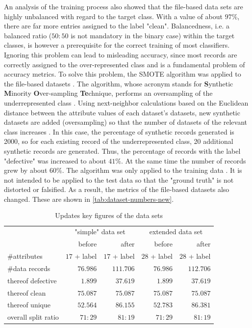 An analysis of the training process also showed that the file-based data sets are highly unbalanced with regard to the target class. With a value of about $97\%$, there are far more entries assigned to the label "clean". Balancedness, i.e. a balanced ratio ($50:50$ is not mandatory in the binary case) within the target classes, is however a prerequisite for the correct training of most classifiers. Ignoring this problem can lead to misleading accuracy, since most records are correctly assigned to the over-represented class and is a fundamental problem of accuracy metrics. To solve this problem, the SMOTE algorithm was applied to the file-based datasets \cite{Chawla2002}. The algorithm, whose acronym stands for \textbf{S}ynthetic \textbf{M}inority \textbf{O}ver-sampling \textbf{Te}chnique, performs an oversampling of the underrepresented class \cite{Chawla2002}. Using next-neighbor calculations based on the Euclidean distance between the attribute values of each dataset's datasets, new synthetic datasets are added (oversampling) so that the number of datasets of the relevant class increases \cite{Chawla2002}. In this case, the percentage of synthetic records generated is 2000, so for each existing record of the underrepresented class, 20 additional synthetic records are generated. Thus, the percentage of records with the label "defective" was increased to about $41\%$. At the same time the number of records grew by about $60\%$. The algorithm was only applied to the training data \cite{Chawla2002} . It is not intended to be applied to the test data so that the "ground truth" is not distorted or falsified. As a result, the metrics of the file-based datasets also changed. These are shown in \autoref{tab:dataset-numbers-new}.

\begin{table}[t]
\centering
\caption{Updates key figures of the data sets}
\label{tab:dataset-numbers-new}
\begin{tabular}{@{}lrrrr@{}}
\toprule
\multirow{2}{*}{}   & \multicolumn{2}{c}{"simple" data set} & \multicolumn{2}{c}{extended data set} \\ \cmidrule(l){2-5} 
                    & before            & after             & before            & after             \\ \midrule
\#attributes        & $17$ + label      & $17$ + label      & $28$ + label      & $28$ + label      \\
\#data records      & $76.986$          & $111.706$         & $76.986$          & $112.706$         \\
thereof defective   & $1.899$           & $37.619$          & $1.899$           & $37.619$          \\
thereof clean       & $75.087$          & $75.087$          & $75.087$          & $75.087$          \\
thereof unique      & $52.564$          & $86.155$          & $52.783$          & $86.381$          \\
overall split ratio & $71:29$           & $81:19$           & $71:29$           & $81:19$           \\ \bottomrule
\end{tabular}
\end{table}

